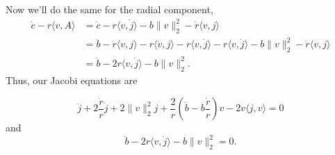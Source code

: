 \documentclass{article}
\begin{document}
Now we'll do the same for the radial component,
\begin{align*}
    \dot c - r\langle v, A\rangle &= \dot c - r\langle v, \dot j\rangle - b\|v\|_2^2 - \dot r\langle v, j\rangle \\
    &= \ddot b - \dot r \langle v, j\rangle - r\langle \dot v, j \rangle - r\langle v, \dot j\rangle  - r\langle v, \dot j\rangle - b\|v\|_2^2 - \dot r\langle v, j\rangle \\
    &= \ddot b - 2r\langle v, \dot j\rangle - b \|v\|_2^2.
\end{align*}
Thus, our Jacobi equations are

\begin{equation}
    \boxed{\ddot j +  2\frac{\dot r}{r}\dot j +2\|v\|_2^2j + \frac{2}{r}\left(\dot b - b\frac{ \dot r}{r}\right)v - 2v\langle j, v\rangle = 0}
\end{equation}
and 
\begin{equation}
    \boxed{\ddot b - 2r\langle v, \dot j\rangle - b \|v\|_2^2 = 0.}
\end{equation}
\end{document}
